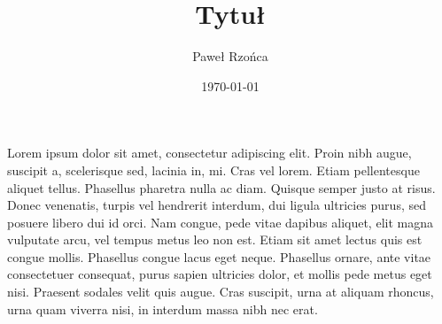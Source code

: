\documentclass[a4paper; 11pt]{article}
\title{Tytuł}
\author{Paweł Rzońca}
\date{\today}
\begin{document}
\maketitle

Lorem ipsum dolor sit amet, consectetur adipiscing elit. 
Proin nibh augue, suscipit a, scelerisque sed, lacinia in, mi. 
Cras vel lorem. Etiam pellentesque aliquet tellus. Phasellus pharetra 
nulla ac diam. Quisque semper justo at risus. 
Donec venenatis, turpis vel hendrerit interdum, dui ligula ultricies purus, 
sed posuere libero dui id orci. Nam congue, pede vitae dapibus aliquet, 
elit magna vulputate arcu, vel tempus metus leo non est. 
Etiam sit amet lectus quis est congue mollis. 
Phasellus congue lacus eget neque. 
Phasellus ornare, ante vitae consectetuer consequat, purus sapien 
ultricies dolor, et mollis pede metus eget nisi. 
Praesent sodales velit quis augue. Cras suscipit, urna at aliquam rhoncus, 
urna quam viverra nisi, in interdum massa nibh nec erat.


\printbibliography
\end{document}
